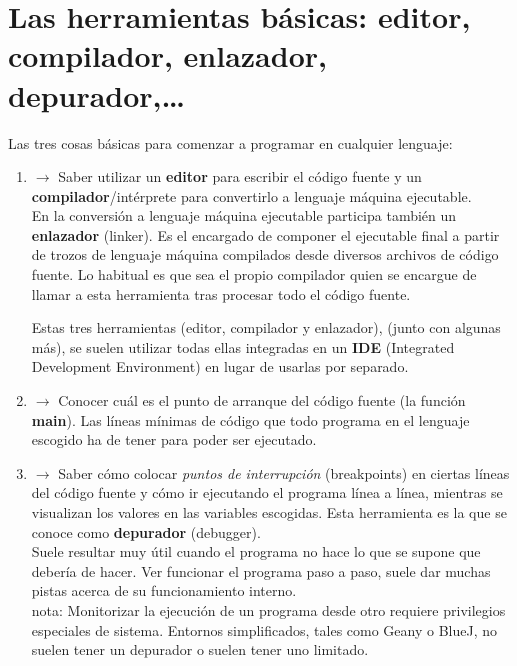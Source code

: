 \documentclass[spanish,12pt,a4paper,final,oneside]{book}
\begin{document}
\section{Las herramientas básicas: editor, compilador,  enlazador, depurador,\ldots}

Las tres cosas básicas para comenzar a programar en cualquier lenguaje:
\begin{enumerate}

\item $\rightarrow$ Saber utilizar un \textbf{editor} para escribir el código fuente y un \textbf{compilador}/intérprete para convertirlo a lenguaje máquina ejecutable.
\\{\footnotesize En la conversión a lenguaje máquina ejecutable participa también un \textbf{enlazador} (linker). Es el encargado de componer el ejecutable final a partir de trozos de lenguaje máquina compilados desde diversos archivos de código fuente. Lo habitual es que sea el propio compilador quien se encargue de llamar a esta herramienta tras procesar todo el código fuente.}

Estas tres herramientas (editor, compilador y enlazador), (junto con algunas más), se suelen utilizar todas ellas integradas en un \textbf{IDE} (Integrated Development Environment) en lugar de usarlas por separado.

\item $\rightarrow$ Conocer cuál es el punto de arranque del código fuente (la función \textbf{main}). Las líneas mínimas de código que todo programa en el lenguaje escogido ha de tener para poder ser ejecutado.

\item $\rightarrow$ Saber cómo colocar \textit{puntos de interrupción} (breakpoints) en ciertas líneas del código fuente y cómo ir ejecutando el programa línea a línea, mientras se visualizan los valores en las variables escogidas. Esta herramienta es la que se conoce como \textbf{depurador} (debugger).
\\Suele resultar muy útil cuando el programa no hace lo que se supone que debería de hacer. Ver funcionar el programa paso a paso, suele dar muchas pistas acerca de su funcionamiento interno.
\\nota: Monitorizar la ejecución de un programa desde otro requiere privilegios especiales de sistema. Entornos simplificados, tales como Geany o BlueJ, no suelen tener un depurador o suelen tener uno limitado.

\end{enumerate}
\end{document}
